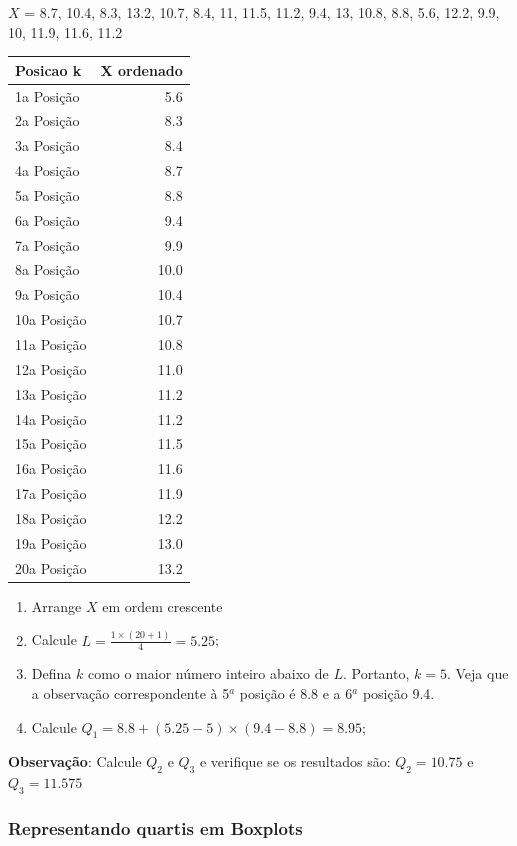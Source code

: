 \documentclass[
]{book}
\begin{document}
\(X\) = 8.7, 10.4, 8.3, 13.2, 10.7, 8.4, 11, 11.5, 11.2, 9.4, 13, 10.8, 8.8, 5.6, 12.2, 9.9, 10, 11.9, 11.6, 11.2

\begin{tabular}{l|r}
\hline
Posicao k & X ordenado\\
\hline
1a Posição & 5.6\\
\hline
2a Posição & 8.3\\
\hline
3a Posição & 8.4\\
\hline
4a Posição & 8.7\\
\hline
5a Posição & 8.8\\
\hline
6a Posição & 9.4\\
\hline
7a Posição & 9.9\\
\hline
8a Posição & 10.0\\
\hline
9a Posição & 10.4\\
\hline
10a Posição & 10.7\\
\hline
11a Posição & 10.8\\
\hline
12a Posição & 11.0\\
\hline
13a Posição & 11.2\\
\hline
14a Posição & 11.2\\
\hline
15a Posição & 11.5\\
\hline
16a Posição & 11.6\\
\hline
17a Posição & 11.9\\
\hline
18a Posição & 12.2\\
\hline
19a Posição & 13.0\\
\hline
20a Posição & 13.2\\
\hline
\end{tabular}

\begin{enumerate}
\def\labelenumi{\arabic{enumi}.}
\item
  Arrange \(X\) em ordem crescente
\item
  Calcule \(L = \frac{1 \times (20+1)}{4} = 5.25\);
\item
  Defina \(k\) como o maior número inteiro abaixo de \(L\). Portanto, \(k = 5\). Veja que a observação correspondente à 5\(^a\) posição é 8.8 e a 6\(^a\) posição 9.4.
\item
  Calcule \(Q_1 = 8.8 + (5.25 - 5) \times (9.4-8.8) = 8.95\);
\end{enumerate}

\textbf{Observação}: Calcule \(Q_2\) e \(Q_3\) e verifique se os resultados são: \(Q_2 = 10.75\) e \(Q_3 = 11.575\)

\hypertarget{representando-quartis-em-boxplots}{%
\subsubsection{Representando quartis em Boxplots}\label{representando-quartis-em-boxplots}}
\end{document}
